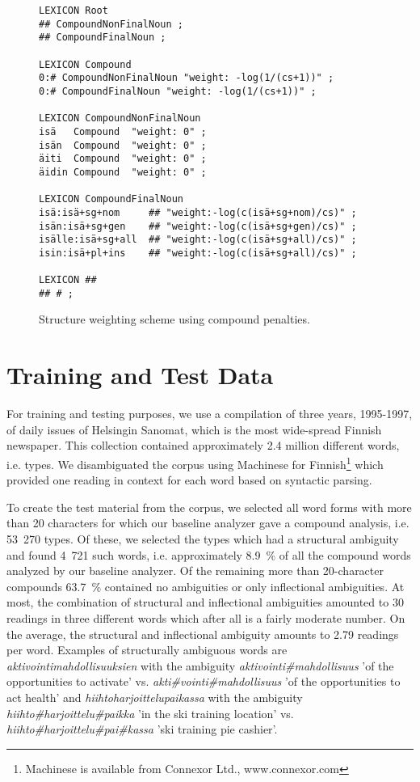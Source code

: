 \documentclass[postprint]{flammie}
\begin{document}
\begin{figure*}[htb!]
  \begin{small}
\begin{verbatim}
LEXICON Root
## CompoundNonFinalNoun ;
## CompoundFinalNoun ;

LEXICON Compound
0:# CompoundNonFinalNoun "weight: -log(1/(cs+1))" ;
0:# CompoundFinalNoun "weight: -log(1/(cs+1))" ;

LEXICON CompoundNonFinalNoun
isä   Compound  "weight: 0" ;
isän  Compound  "weight: 0" ;
äiti  Compound  "weight: 0" ;
äidin Compound  "weight: 0" ;

LEXICON CompoundFinalNoun
isä:isä+sg+nom     ## "weight:-log(c(isä+sg+nom)/cs)" ;
isän:isä+sg+gen    ## "weight:-log(c(isä+sg+gen)/cs)" ;
isälle:isä+sg+all  ## "weight:-log(c(isä+sg+all)/cs)" ;
isin:isä+pl+ins    ## "weight:-log(c(isä+sg+all)/cs)" ;

LEXICON ##
## # ;
\end{verbatim}
    \caption{Structure weighting scheme using compound penalties.
    }\label{fig:weighted3}
  \end{small}
\end{figure*}


\section{Training and Test Data}
\label{Sect4}

For training and testing purposes, we use a compilation of three
years, 1995-1997, of daily issues of Helsingin Sanomat, which is the
most wide-spread Finnish newspaper. This collection contained
approximately 2.4 million different words, i.e. types. We
disambiguated the corpus using Machinese for
Finnish\footnote{Machinese is available from Connexor Ltd.,
  www.connexor.com} which provided one reading in context for each
word based on syntactic parsing.

To create the test material from the corpus, we selected all word
forms with more than 20 characters for which our baseline analyzer
\cite{pirinen/2008} gave a compound analysis, i.e. 53~270 types. Of
these, we selected the types which had a structural ambiguity and
found 4~721 such words, i.e. approximately 8.9~\% of all the compound
words analyzed by our baseline analyzer. Of the remaining more than
20-character compounds 63.7~\% contained no ambiguities or only
inflectional ambiguities. At most, the combination of structural and
inflectional ambiguities amounted to 30 readings in three different
words which after all is a fairly moderate number. On the average, the
structural and inflectional ambiguity amounts to 2.79 readings per
word. Examples of structurally ambiguous words are
\emph{aktivointi\-mahdollisuuksien} with the ambiguity
\emph{aktivointi\#mahdollisuus} 'of the opportunities to activate' vs.
\emph{akti\#vointi\#mahdollisuus} 'of the opportunities to act health'
and \emph{hiihto\-harjoittelu\-paikassa} with the ambiguity
\emph{hiihto\#harjoittelu\#paikka} 'in the ski training location'
vs. \emph{hiihto\#harjoittelu\#pai\#kassa} 'ski training pie cashier'.
\end{document}
